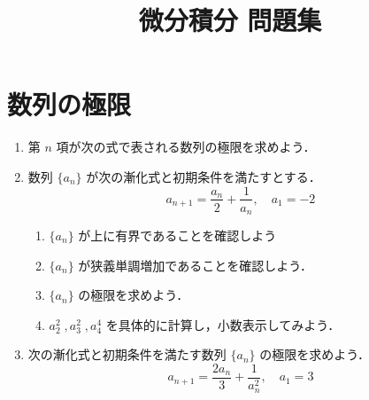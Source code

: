 \documentclass[11pt, uplatex, dvipdfmx, twoside]{jsarticle}
\title{\Huge 微分積分 問題集}
\newcommand{\ds}{\displaystyle}
\begin{document}
\maketitle
\thispagestyle{empty}

\newpage



\section{数列の極限}\label{sec:sequence}

\begin{enumerate}[label=\arabic{section}.\arabic*]
  
  \setlength{\itemsep}{1zh}
  
\item 第 $n$ 項が次の式で表される数列の極限を求めよう．

  \vspace{1zh}
  

\item 数列 $\{a_n\}$ が次の漸化式と初期条件を満たすとする．
  \[
    a_{n+1} = \frac{a_{n}}{2}+\frac{1}{a_{n}} ,\quad a_1=-2
  \]
  \begin{enumerate}[label=(\arabic*)]
    \setlength{\itemsep}{1ex}


  \item $\{a_n\}$ が上に有界であることを確認しよう
    
  \item $\{a_n\}$ が狭義単調増加であることを確認しよう．

  \item $\{a_n\}$ の極限を求めよう．

  \item $a_2^2\; , a_3^2\; , a_4^4$ を具体的に計算し，小数表示してみよう．
  \end{enumerate}

\item 次の漸化式と初期条件を満たす数列 $\{a_n\}$ の極限を求めよう．
  \[
    a_{n+1} = \frac{2a_{n}}{3} + \frac{1}{a_{n}^2}, \quad a_1 = 3
  \]
\end{enumerate}
\end{document}
